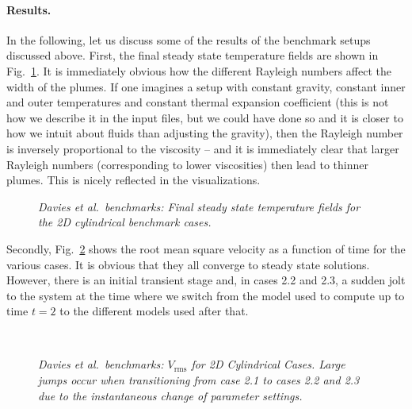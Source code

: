 \documentclass{article}
\begin{document}



\paragraph{Results.}

In the following, let us discuss some of the results of the benchmark setups
discussed above. First, the final steady state temperature fields are shown in
Fig.~\ref{fig:davies-2DcylinderFSS}. It is immediately obvious how the
different Rayleigh numbers affect the width of the plumes. If one imagines a
setup with constant gravity, constant inner and outer temperatures and
constant thermal expansion coefficient (this is not how we describe it in the
input files, but we could have done so and it is closer to how we intuit about
fluids than adjusting the gravity), then the Rayleigh number is inversely
proportional to the viscosity -- and it is immediately clear that larger
Rayleigh numbers (corresponding to lower viscosities) then lead to thinner
plumes. This is nicely reflected in the visualizations.

\begin{figure}[h]
  \hfill
  \hfill
  \hfill
  \hfill
  \caption{\it Davies et al.~benchmarks: Final steady state temperature fields for
    the 2D cylindrical benchmark cases.}
  \label{fig:davies-2DcylinderFSS}
\end{figure}

Secondly, Fig.~\ref{fig:davies-2DcylinderVrms} shows the root mean square
velocity as a function of time for the various cases. It is obvious that they
all converge to steady state solutions. However, there is an initial transient
stage and, in cases 2.2 and 2.3, a sudden jolt to the system at the time where
we switch from the model used to compute up to time $t=2$ to the
different models used after that.

\begin{figure}[h]
  \hfill
  \\
  \hfill
  \hfill
  \caption{\it Davies et al.~benchmarks: $V_{\text{rms}}$ for 2D Cylindrical Cases. Large jumps occur when transitioning from case 2.1 to cases 2.2 and 2.3 due to the instantaneous change of parameter settings.}
  \label{fig:davies-2DcylinderVrms}
\end{figure}
\end{document}
